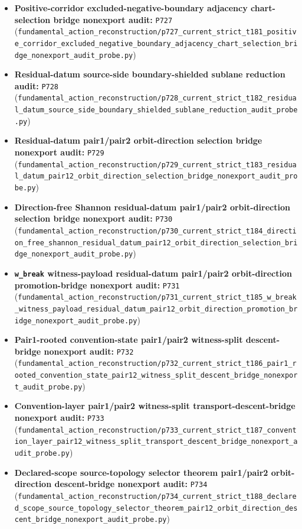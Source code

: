 \documentclass[11pt,a4paper]{article}
\begin{document}
\begin{itemize}
  \item \textbf{Positive-corridor excluded-negative-boundary adjacency chart-selection bridge nonexport audit:} \texttt{P727} (\verb|fundamental_action_reconstruction/p727_current_strict_t181_positive_corridor_excluded_negative_boundary_adjacency_chart_selection_bridge_nonexport_audit_probe.py|)
  \item \textbf{Residual-datum source-side boundary-shielded sublane reduction audit:} \texttt{P728} (\verb|fundamental_action_reconstruction/p728_current_strict_t182_residual_datum_source_side_boundary_shielded_sublane_reduction_audit_probe.py|)
  \item \textbf{Residual-datum pair1/pair2 orbit-direction selection bridge nonexport audit:} \texttt{P729} (\verb|fundamental_action_reconstruction/p729_current_strict_t183_residual_datum_pair12_orbit_direction_selection_bridge_nonexport_audit_probe.py|)
  \item \textbf{Direction-free Shannon residual-datum pair1/pair2 orbit-direction selection bridge nonexport audit:} \texttt{P730} (\verb|fundamental_action_reconstruction/p730_current_strict_t184_direction_free_shannon_residual_datum_pair12_orbit_direction_selection_bridge_nonexport_audit_probe.py|)
  \item \textbf{\texttt{w\_break} witness-payload residual-datum pair1/pair2 orbit-direction promotion-bridge nonexport audit:} \texttt{P731} (\verb|fundamental_action_reconstruction/p731_current_strict_t185_w_break_witness_payload_residual_datum_pair12_orbit_direction_promotion_bridge_nonexport_audit_probe.py|)
  \item \textbf{Pair1-rooted convention-state pair1/pair2 witness-split descent-bridge nonexport audit:} \texttt{P732} (\verb|fundamental_action_reconstruction/p732_current_strict_t186_pair1_rooted_convention_state_pair12_witness_split_descent_bridge_nonexport_audit_probe.py|)
  \item \textbf{Convention-layer pair1/pair2 witness-split transport-descent-bridge nonexport audit:} \texttt{P733} (\verb|fundamental_action_reconstruction/p733_current_strict_t187_convention_layer_pair12_witness_split_transport_descent_bridge_nonexport_audit_probe.py|)
  \item \textbf{Declared-scope source-topology selector theorem pair1/pair2 orbit-direction descent-bridge nonexport audit:} \texttt{P734} (\verb|fundamental_action_reconstruction/p734_current_strict_t188_declared_scope_source_topology_selector_theorem_pair12_orbit_direction_descent_bridge_nonexport_audit_probe.py|)

\end{itemize}
\end{document}
